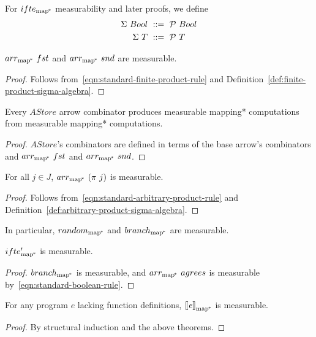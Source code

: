 \documentclass[preprint]{sigplanconf}
\newcommand{\arrowarr}{\ensuremath{arr}}
\newcommand{\arrowif}{\ensuremath{ifte}}
\newcommand{\pmap}{_\mathrm{map^{\mspace{-2mu}*}}}
\newcommand{\arrpmap}{\arrowarr\pmap}
\newcommand{\ifpmap}{\arrowif\pmap}
\begin{document}
For $\ifpmap$ measurability and later proofs, we define
\begin{align}
	\Sigma~Bool &\ ::=\ \mathcal{P}~Bool
	\label{eqn:standard-boolean-rule}
\\
	\Sigma~T &\ ::=\ \mathcal{P}~T
	\label{eqn:standard-traces-rule}
\end{align}

\begin{theorem}
$\arrpmap~fst$ and $\arrpmap~snd$ are measurable.
\end{theorem}
\begin{proof}
Follows from~\eqref{eqn:standard-finite-product-rule} and Definition~\ref{def:finite-product-sigma-algebra}.
\end{proof}

\begin{theorem}
Every $AStore$ arrow combinator produces measurable mapping* computations from measurable mapping* computations.
\label{thm:astore-measurability-transfer}
\end{theorem}
\begin{proof}
$AStore$'s combinators are defined in terms of the base arrow's combinators and $\arrpmap~fst$ and $\arrpmap~snd$.
\end{proof}

\begin{theorem}
For all $j \in J$, $\arrpmap~(\pi~j)$ is measurable.
\end{theorem}
\begin{proof}
Follows from~\eqref{eqn:standard-arbitrary-product-rule} and Definition~\ref{def:arbitrary-product-sigma-algebra}.
\end{proof}

In particular, $random\pmap$ and $branch\pmap$ are measurable.

\begin{theorem}
$\ifpmap'$ is measurable.
\end{theorem}
\begin{proof}
$branch\pmap$ is measurable, and $\arrpmap~agrees$ is measurable by~\eqref{eqn:standard-boolean-rule}.
\end{proof}

\begin{theorem}
For any program $\mathit{e}$ lacking function definitions, $\meaningof{\mathit{e}}\pmap$ is measurable.
\label{thm:nonrecursive-programs-are-measurable}
\end{theorem}
\begin{proof}
By structural induction and the above theorems.
\end{proof}
\end{document}
